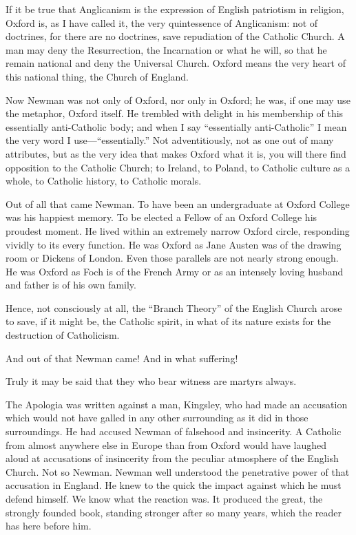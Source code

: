 If it be true that Anglicanism is the expression of
English patriotism in religion, Oxford is, as I have called it, the very
quintessence of Anglicanism: not of doctrines, for there are no
doctrines, save repudiation of the Catholic Church. A man may deny the
Resurrection, the Incarnation or what he will, so that he remain
national and deny the Universal Church. Oxford means the very heart of
this national thing, the Church of England.

Now Newman was not only of Oxford, nor only in
Oxford; he was, if one may use the metaphor, Oxford itself. He trembled
with delight in his membership of this essentially anti-Catholic body;
and when I say ``essentially anti-Catholic'' I mean the very word I use—``essentially.''
Not adventitiously, not as one out of many attributes, but as the very
idea that makes Oxford what it is, you will there find opposition to the
Catholic Church; to Ireland, to Poland, to Catholic culture as a whole,
to Catholic history, to Catholic morals.

Out of all that came Newman. To have been an
undergraduate at Oxford College was his happiest memory. To be elected a
Fellow of an Oxford College his proudest moment. He lived within an
extremely narrow Oxford circle, responding vividly to its every
function. He was Oxford as Jane Austen was of the drawing room or
Dickens of London. Even those parallels are not nearly strong enough. He
was Oxford as Foch is of the French Army or as an intensely loving
husband and father is of his own family.

Hence, not consciously at all, the ``Branch Theory''
of the English Church arose to save, if it might be, the Catholic
spirit, in what of its nature exists for the destruction of Catholicism.

And out of that Newman came! And in what suffering!

Truly it may be said that they who bear witness are
martyrs always.

The Apologia was written against a man, Kingsley,
who had made an accusation which would not have galled in any other
surrounding as it did in those surroundings. He had accused Newman of
falsehood and insincerity. A Catholic from almost anywhere else in
Europe than from Oxford would have laughed aloud at accusations of
insincerity from the peculiar atmosphere of the English Church. Not so
Newman. Newman well understood the penetrative power of that accusation
in England. He knew to the quick the impact against which he must defend
himself. We know what the reaction was. It produced the great, the
strongly founded book, standing stronger after so many years, which the
reader has here before him.

